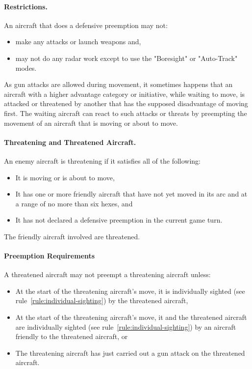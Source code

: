 {\paragraph{Restrictions.} An aircraft that does a defensive preemption may not:  

\begin{itemize}
    \item make any attacks or launch weapons and,
    \item may not do any radar work except to use the "Boresight" or "Auto-Track" modes.
\end{itemize}	
}{

As gun attacks are allowed during movement, it sometimes happens that an aircraft with a higher advantage category or initiative, while waiting to move, is attacked or threatened by another that has the supposed disadvantage of moving first. The waiting aircraft can react to such attacks or threats by preempting the movement of an aircraft that is moving or about to move.

\paragraph{Threatening and Threatened Aircraft.} An enemy aircraft is threatening if it satisfies all of the following:

\begin{itemize}
\item It is moving or is about to move,
\item It has one or more friendly aircraft that have not yet moved in its  arc and at a range of no more than six hexes, and
\item It has not declared a defensive preemption in the current game turn.
\end{itemize}
The friendly aircraft involved are threatened.

\paragraph{Preemption Requirements} A threatened aircraft may not preempt a threatening aircraft unless:
\begin{itemize}
     \item At the start of the threatening aircraft’s move, it is individually sighted (see rule~\ref{rule:individual-sighting}) by the threatened aircraft,
     \item At the start of the threatening aircraft’s move, it and the threatened aircraft are individually sighted (see rule~\ref{rule:individual-sighting}) by an aircraft friendly to the threatened aircraft, or
     \item The threatening aircraft has just carried out a gun attack on the threatened aircraft.
\end{itemize}

}
